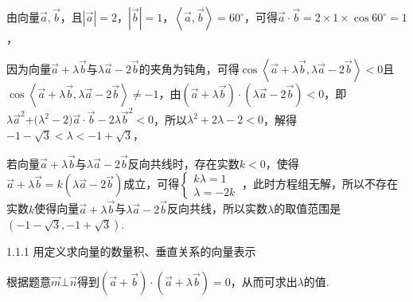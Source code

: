 由向量\(\overrightarrow{a},\overrightarrow{b}\)，且\(\left| \overrightarrow{a} \right| = 2\)，\(\left| \overrightarrow{b} \right| = 1\)，\(\left\langle \overrightarrow{a},\overrightarrow{b} \right\rangle = 60^{\circ}\)，可得\(\overrightarrow{a} \cdot \overrightarrow{b} = 2 \times 1 \times \cos 60^{\circ} = 1\)，

因为向量\(\overrightarrow{a} + \lambda\overrightarrow{b}\)与\(\lambda\overrightarrow{a} - 2\overrightarrow{b}\)的夹角为钝角，可得\(\cos\left\langle \overrightarrow{a} + \lambda\overrightarrow{b},\lambda\overrightarrow{a} - 2\overrightarrow{b} \right\rangle < 0\)且\(\cos\left\langle \overrightarrow{a} + \lambda\overrightarrow{b},\lambda\overrightarrow{a} - 2\overrightarrow{b} \right\rangle \neq - 1\)，由\(\left( \overrightarrow{a} + \lambda\overrightarrow{b} \right) \cdot \left( \lambda\overrightarrow{a} - 2\overrightarrow{b} \right) < 0\)，即\(\lambda{\overrightarrow{a}}^{2}\text{+(}\lambda^{2} - 2)\overrightarrow{a} \cdot \overrightarrow{b} - 2\lambda{\overrightarrow{b}}^{2} < 0\)，所以\(\lambda^{2} + 2\lambda - 2 < 0\)，解得\(- 1 - \sqrt{3} < \lambda < - 1 + \sqrt{3}\)，

若向量\(\overrightarrow{a} + \lambda\overrightarrow{b}\)与\(\lambda\overrightarrow{a} - 2\overrightarrow{b}\)反向共线时，存在实数\(k < 0\)，使得\(\overrightarrow{a} + \lambda\overrightarrow{b} = k(\lambda\overrightarrow{a} - 2\overrightarrow{b})\)成立，可得\(\left\{ \begin{array}{r}
k\lambda = 1 \\
\lambda = - 2k
\end{array} \right.\ \)，此时方程组无解，所以不存在实数\(k\)使得向量\(\overrightarrow{a} + \lambda\overrightarrow{b}\)与\(\lambda\overrightarrow{a} - 2\overrightarrow{b}\)反向共线，所以实数\(\lambda\)的取值范围是\(\left( - 1 - \sqrt{3}, - 1 + \sqrt{3} \right)\).


\noindent{}\quad{}1.1.1 用定义求向量的数量积、垂直关系的向量表示

根据题意\(\overrightarrow{m}\bot\overrightarrow{n}\)得到\(\left( \overrightarrow{a} + \overrightarrow{b} \right) \cdot \left( \overrightarrow{a} + \lambda\overrightarrow{b} \right) = 0\)，从而可求出\(\lambda\)的值.

